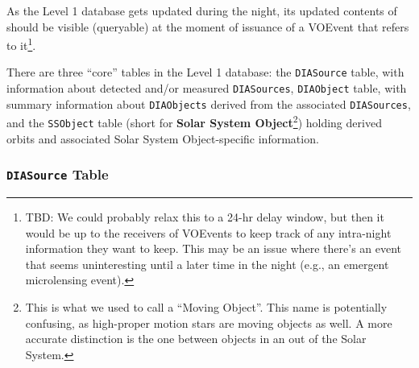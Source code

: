 \documentclass[12pt]{article}
\newcommand{\code}[1]{\texttt{#1}}
\newcommand{\DIASource}{\code{DIASource}\xspace}
\newcommand{\DIASources}{\code{DIASources}\xspace}
\newcommand{\DIAObject}{\code{DIAObject}\xspace}
\newcommand{\DIAObjects}{\code{DIAObjects}\xspace}
\newcommand{\DB}{{Level 1 database}\xspace}
\newcommand{\SSObject}{\code{SSObject}\xspace}
\begin{document}
As the \DB gets updated during the night, its updated contents of should be visible (queryable) at the moment of issuance of a VOEvent that refers to it\footnote{TBD: We could probably relax this to a 24-hr delay window, but then it would be up to the receivers of VOEvents to keep track of any intra-night information they want to keep. This may be an issue where there's an event that seems uninteresting until a later time in the night (e.g., an emergent microlensing event).}.

There are three ``core'' tables in the \DB: the \DIASource table, with information about detected and/or measured \DIASources, \DIAObject table, with summary information about \DIAObjects derived from the associated \DIASources, and the \SSObject table (short for {\bf Solar System Object}\footnote{This is what we used to call a ``Moving Object''. This name is potentially confusing, as high-proper motion stars are moving objects as well. A more accurate distinction is the one between objects in an out of the Solar System.}) holding derived orbits and associated Solar System Object-specific information.

\subsubsection{\DIASource Table}
\end{document}
